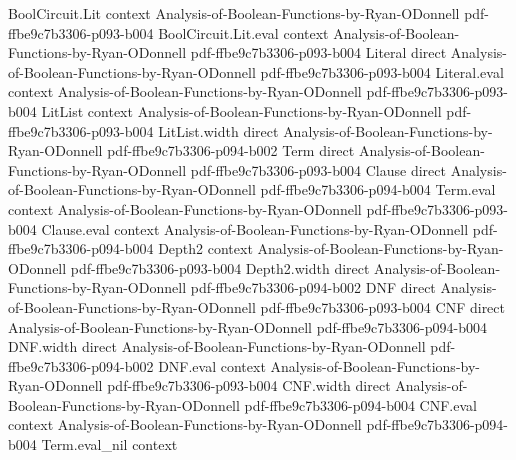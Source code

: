 \begin{theorem}
\leanok
{}
\proofstep
  {BoolCircuit.Lit}
  {context}
  {Analysis-of-Boolean-Functions-by-Ryan-ODonnell}
  {pdf-ffbe9c7b3306-p093-b004}
\proofstep
  {BoolCircuit.Lit.eval}
  {context}
  {Analysis-of-Boolean-Functions-by-Ryan-ODonnell}
  {pdf-ffbe9c7b3306-p093-b004}
\proofstep
  {Literal}
  {direct}
  {Analysis-of-Boolean-Functions-by-Ryan-ODonnell}
  {pdf-ffbe9c7b3306-p093-b004}
\proofstep
  {Literal.eval}
  {context}
  {Analysis-of-Boolean-Functions-by-Ryan-ODonnell}
  {pdf-ffbe9c7b3306-p093-b004}
\proofstep
  {LitList}
  {context}
  {Analysis-of-Boolean-Functions-by-Ryan-ODonnell}
  {pdf-ffbe9c7b3306-p093-b004}
\proofstep
  {LitList.width}
  {direct}
  {Analysis-of-Boolean-Functions-by-Ryan-ODonnell}
  {pdf-ffbe9c7b3306-p094-b002}
\proofstep
  {Term}
  {direct}
  {Analysis-of-Boolean-Functions-by-Ryan-ODonnell}
  {pdf-ffbe9c7b3306-p093-b004}
\proofstep
  {Clause}
  {direct}
  {Analysis-of-Boolean-Functions-by-Ryan-ODonnell}
  {pdf-ffbe9c7b3306-p094-b004}
\proofstep
  {Term.eval}
  {context}
  {Analysis-of-Boolean-Functions-by-Ryan-ODonnell}
  {pdf-ffbe9c7b3306-p093-b004}
\proofstep
  {Clause.eval}
  {context}
  {Analysis-of-Boolean-Functions-by-Ryan-ODonnell}
  {pdf-ffbe9c7b3306-p094-b004}
\proofstep
  {Depth2}
  {context}
  {Analysis-of-Boolean-Functions-by-Ryan-ODonnell}
  {pdf-ffbe9c7b3306-p093-b004}
\proofstep
  {Depth2.width}
  {direct}
  {Analysis-of-Boolean-Functions-by-Ryan-ODonnell}
  {pdf-ffbe9c7b3306-p094-b002}
\proofstep
  {DNF}
  {direct}
  {Analysis-of-Boolean-Functions-by-Ryan-ODonnell}
  {pdf-ffbe9c7b3306-p093-b004}
\proofstep
  {CNF}
  {direct}
  {Analysis-of-Boolean-Functions-by-Ryan-ODonnell}
  {pdf-ffbe9c7b3306-p094-b004}
\proofstep
  {DNF.width}
  {direct}
  {Analysis-of-Boolean-Functions-by-Ryan-ODonnell}
  {pdf-ffbe9c7b3306-p094-b002}
\proofstep
  {DNF.eval}
  {context}
  {Analysis-of-Boolean-Functions-by-Ryan-ODonnell}
  {pdf-ffbe9c7b3306-p093-b004}
\proofstep
  {CNF.width}
  {direct}
  {Analysis-of-Boolean-Functions-by-Ryan-ODonnell}
  {pdf-ffbe9c7b3306-p094-b004}
\proofstep
  {CNF.eval}
  {context}
  {Analysis-of-Boolean-Functions-by-Ryan-ODonnell}
  {pdf-ffbe9c7b3306-p094-b004}
\proofstep
  {Term.eval_nil}
  {context}

\end{theorem}
